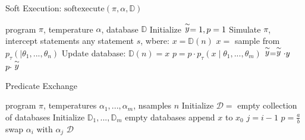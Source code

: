 \begin{algorithm}[tb]
  \caption{Soft Execution: $\textrm{softexecute}(\pi, \alpha, \mathbb{D})$}
  \label{alg:softexecute}
\begin{algorithmic}
 program $\pi$, temperature $\alpha$, database $\mathbb{D}$
\STATE Initialize $\stackrel{\sim}{y} = 1, p = 1$
\STATE Simulate $\pi$, intercept statements any statement $s$, wbere:   
   \STATE $x = \mathbb{D}(n)$
 \ELSE
   \STATE $x = $ sample from $p_\tau(\mid \theta_1, ..., \theta_n)$
   \STATE Update database: $\mathbb{D}(n) = x$
 \ENDIF
 \STATE $p = p \cdot p_\tau(x \mid \theta_1, ..., \theta_m)$
   \STATE $\stackrel{\sim}{y} = \stackrel{\sim}{y} \cdot y$
 \ENDIF
{} $p \cdot \stackrel{\sim}{y}$
\end{algorithmic}
\end{algorithm}


\begin{algorithm}[tb]
  \caption{Predicate Exchange}
  \label{alg:predexchange}
\begin{algorithmic}
 program $\pi$, temperatures $\alpha_1, ...,\alpha_m$, nsamples $n$
\STATE Initialize $\mathcal{D} = $ empty collection of databases
\STATE Initialize $\mathbb{D}_1,...,\mathbb{D}_m$ empty databases
\REPEAT
      \STATE append $x$ to $x_0$
    \ENDIF
  \ENDFOR
    \STATE $j = i - 1$
    \STATE $p = \frac{a}{b}$
      \STATE swap $\alpha_i$ with $\alpha_j$
    \ENDIF
  \ENDFOR
{}
 $\mathcal{D}$
\end{algorithmic}
\end{algorithm}
